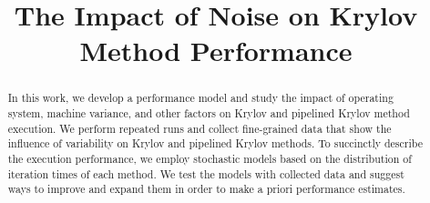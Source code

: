 \documentclass[sigconf]{acmart}
\begin{document}
%
\title{The Impact of Noise on Krylov Method Performance}

%
\begin{abstract}
In this work, we develop a performance model and study the impact of 
operating system, machine variance, and other factors on Krylov and pipelined Krylov method execution.
We perform repeated runs and collect fine-grained data that 
 show the influence of variability on Krylov and pipelined Krylov methods.
To succinctly describe the execution performance, we 
 employ stochastic models based on the distribution of iteration times of each method.
 We test the models with collected data and suggest ways to improve and expand them in order to make a priori performance estimates.
\end{abstract}
\end{document}
